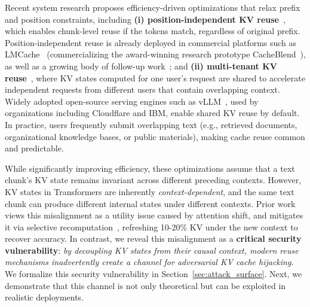 Recent system research proposes efficiency-driven optimizations that relax prefix and position constraints, including {\textbf{(i) position-independent KV reuse}}~\cite{yao2025cacheblend, hu2025epic, wang2025mepic, yang2025kvshare, yang2025kvlink}, which enables chunk-level reuse if the tokens match, regardless of original prefix. Position-independent reuse is already deployed in commercial platforms such as LMCache~\cite{LMCache} (commercializing the award-winning research prototype CacheBlend~\cite{yao2025cacheblend}), as well as a growing body of follow-up work~\cite{hu2025epic, wang2025mepic, yang2025kvshare}; and {\textbf{(ii) multi-tenant KV reuse}}~\cite{vllm, wu2025know}, where KV states computed for one user's request are shared to accelerate independent requests from different users that contain overlapping context. 
Widely adopted open-source serving engines such as vLLM~\cite{vllm}, used by organizations including Cloudflare and IBM, enable shared KV reuse by default. In practice, users frequently submit overlapping text (e.g., retrieved documents, organizational knowledge bases, or public materials), making cache reuse common and predictable. 

While significantly improving efficiency, these optimizations assume that a text chunk's KV state remains invariant across different preceding contexts.
% 
However, KV states in Transformers are inherently \emph{context-dependent}, and the same text chunk can produce different internal states under different contexts. Prior work views this misalignment as a utility issue caused by attention shift, and mitigates it via selective recomputation~\cite{yao2025cacheblend, hu2025epic}, refreshing 10-20\% KV under the new context to recover accuracy. In contrast, we reveal this misalignment as a \textbf{critical security vulnerability}: \emph{by decoupling KV states from their causal context, modern reuse mechanisms inadvertently create a channel for adversarial KV cache hijacking.} We formalize this security vulnerability in Section~\ref{sec:attack_surface}. Next, we demonstrate that this channel is not only theoretical but can be exploited in realistic deployments.


